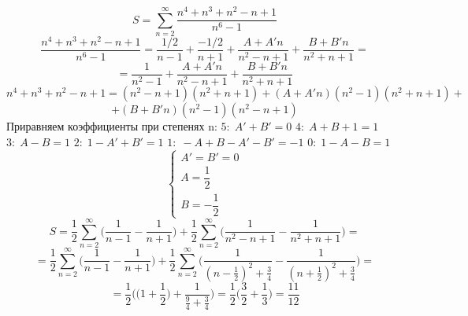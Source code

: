 


	$$S = \sum_{n= 2}^{\infty} \frac{n^4+n^3+n^2-n+1}{n^6-1} $$
	$$ \frac{n^4+n^3+n^2-n+1}{n^6-1} = \frac{1/2}{n-1}+\frac{-1/2}{n+1}+\frac{A+A'n}{n^2-n+1}+\frac{B+B'n}{n^2+n+1}=$$
	$$= \frac{1}{n^2-1}+\frac{A+A'n}{n^2-n+1}+\frac{B+B'n}{n^2+n+1}$$
	$$n^4+n^3+n^2-n+1 = (n^2-n+1)(n^2+n+1)+(A+A'n)(n^2-1)(n^2+n+1)+$$
	$$+(B+B'n)(n^2-1)(n^2-n+1)$$
	Приравняем коэффициенты при степенях n:
	\newline
	$5: \; A'+B' = 0$
	\newline
	$4: \; A+B+1 = 1$
	\newline
	$3: \; A-B = 1$
	\newline
	$2: \; 1-A'+B' = 1$
	\newline
	$1: \; -A+B-A'-B' = -1$
	\newline
	$0: \; 1-A-B = 1$
	\newline
	$$\begin{cases}
		A'=B' = 0\\
		A = \dfrac{1}{2}\\
		B =  -\dfrac{1}{2}
	\end{cases}$$
	$$S = \frac{1}{2} \sum_{n= 2}^{\infty} \Bigg(\frac{1}{n-1}-\frac{1}{n+1}\Bigg)+\frac{1}{2} \sum_{n= 2}^{\infty} \Bigg(\frac{1}{n^2-n+1}-\frac{1}{n^2+n+1}\Bigg)=$$
	$$= \frac{1}{2} \sum_{n= 2}^{\infty} \Bigg(\frac{1}{n-1}-\frac{1}{n+1}\Bigg)+\frac{1}{2} \sum_{n= 2}^{\infty} \Bigg(\frac{1}{(n-\frac{1}{2})^2+\frac{3}{4}}-\frac{1}{(n+\frac{1}{2})^2+\frac{3}{4}}\Bigg)=$$
	$$=\frac{1}{2} \Bigg( \Big(1+\frac{1}{2}\Big)+ \frac{1}{\frac{9}{4}+\frac{3}{4}}  \Bigg) = \frac{1}{2}\Bigg( \frac{3}{2} +\frac{1}{3} \Bigg) = \frac{11}{12}$$
	
